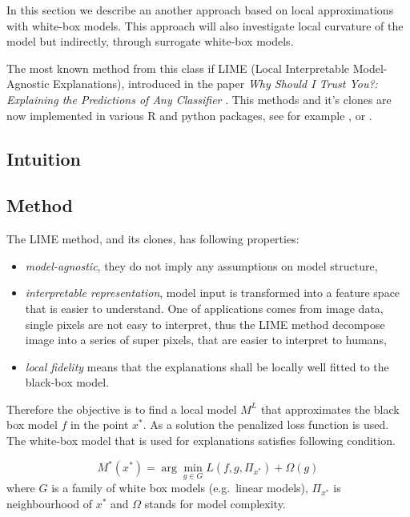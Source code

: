 \documentclass[]{krantz}
\providecommand{\tightlist}{%
  \setlength{\itemsep}{0pt}\setlength{\parskip}{0pt}}
\theoremstyle{definition}
\theoremstyle{definition}
\theoremstyle{definition}
\theoremstyle{remark}
\begin{document}
In this section we describe an another approach based on local
approximations with white-box models. This approach will also
investigate local curvature of the model but indirectly, through
surrogate white-box models.

The most known method from this class if LIME (Local Interpretable
Model-Agnostic Explanations), introduced in the paper \emph{Why Should I
Trust You?: Explaining the Predictions of Any Classifier} \citep{lime}.
This methods and it's clones are now implemented in various R and python
packages, see for example \citep{R-lime}, \citep{R-live} or
\citep{R-iml}.

\hypertarget{intuition-5}{%
\subsection{Intuition}\label{intuition-5}}

\hypertarget{method-4}{%
\subsection{Method}\label{method-4}}

The LIME method, and its clones, has following properties:

\begin{itemize}
\tightlist
\item
  \emph{model-agnostic}, they do not imply any assumptions on model
  structure,
\item
  \emph{interpretable representation}, model input is transformed into a
  feature space that is easier to understand. One of applications comes
  from image data, single pixels are not easy to interpret, thus the
  LIME method decompose image into a series of super pixels, that are
  easier to interpret to humans,
\item
  \emph{local fidelity} means that the explanations shall be locally
  well fitted to the black-box model.
\end{itemize}

Therefore the objective is to find a local model \(M^L\) that
approximates the black box model \(f\) in the point \(x^*\). As a
solution the penalized loss function is used. The white-box model that
is used for explanations satisfies following condition.

\[
M^*(x^*) = \arg \min_{g \in G} L(f, g, \Pi_{x^*}) + \Omega (g) 
\] where \(G\) is a family of white box models (e.g.~linear models),
\(\Pi_{x^*}\) is neighbourhood of \(x^*\) and \(\Omega\) stands for
model complexity.
\end{document}
